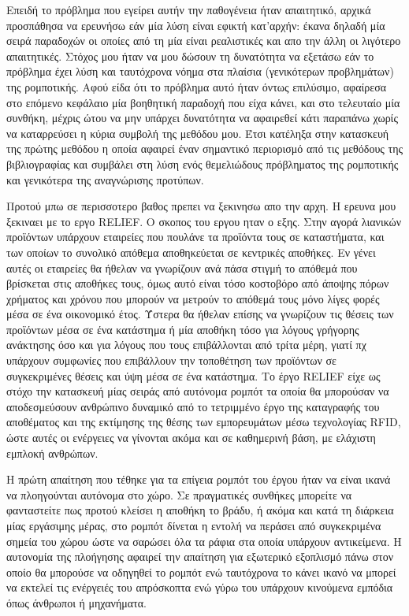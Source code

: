 \documentclass[a4paper,10pt]{article}
\begin{document}
Επειδή το πρόβλημα που εγείρει αυτήν την παθογένεια ήταν απαιτητικό, αρχικά
προσπάθησα να ερευνήσω εάν μία λύση είναι εφικτή κατ'αρχήν: έκανα δηλαδή μία
σειρά παραδοχών οι οποίες από τη μία είναι ρεαλιστικές και απο την άλλη οι
λιγότερο απαιτητικές. Στόχος μου ήταν να μου δώσουν τη δυνατότητα να εξετάσω
εάν το πρόβλημα έχει λύση και ταυτόχρονα νόημα στα πλαίσια (γενικότερων
προβλημάτων) της ρομποτικής. Αφού είδα ότι το πρόβλημα αυτό ήταν όντως
επιλύσιμο, αφαίρεσα στο επόμενο κεφάλαιο μία βοηθητική παραδοχή που είχα κάνει,
και στο τελευταίο μία συνθήκη, μέχρις ώτου να μην υπάρχει δυνατότητα να
αφαιρεθεί κάτι παραπάνω χωρίς να καταρρεύσει η κύρια συμβολή της μεθόδου μου.
Έτσι κατέληξα στην κατασκευή της πρώτης μεθόδου η οποία αφαιρεί έναν σημαντικό
περιορισμό από τις μεθόδους της βιβλιογραφίας και συμβάλει στη λύση ενός
θεμελιώδους πρόβληματος της ρομποτικής και γενικότερα της αναγνώρισης προτύπων.



Προτού μπω σε περισσοτερο βαθος πρεπει να ξεκινησω απο την αρχη. Η ερευνα μου
ξεκιναει με το εργο RELIEF. Ο σκοπος του εργου ηταν ο εξης. Στην αγορά λιανικών
προϊόντων υπάρχουν εταιρείες που πουλάνε τα προϊόντα τους σε καταστήματα, και
των οποίων το συνολικό απόθεμα αποθηκεύεται σε κεντρικές αποθήκες. Εν γένει
αυτές οι εταιρείες θα ήθελαν να γνωρίζουν ανά πάσα στιγμή το απόθεμά που
βρίσκεται στις αποθήκες τους, όμως αυτό είναι τόσο κοστοβόρο από άποψης πόρων
χρήματος και χρόνου που μπορούν να μετρούν το απόθεμά τους μόνο λίγες φορές
μέσα σε ένα οικονομικό έτος. Ύστερα θα ήθελαν επίσης να γνωρίζουν τις θέσεις
των προϊόντων μέσα σε ένα κατάστημα ή μία αποθήκη τόσο για λόγους γρήγορης
ανάκτησης όσο και για λόγους που τους επιβάλλονται από τρίτα μέρη, γιατί πχ
υπάρχουν συμφωνίες που επιβάλλουν την τοποθέτηση των προϊόντων σε συγκεκριμένες
θέσεις και ύψη μέσα σε ένα κατάστημα. Το έργο RELIEF είχε ως στόχο την
κατασκευή μίας σειράς από αυτόνομα ρομπότ τα οποία θα μπορούσαν να
αποδεσμεύσουν ανθρώπινο δυναμικό από το τετριμμένο έργο της καταγραφής του
αποθέματος και της εκτίμησης της θέσης των εμπορευμάτων μέσω τεχνολογίας RFID,
ώστε αυτές οι ενέργειες να γίνονται ακόμα και σε καθημερινή βάση, με ελάχιστη
εμπλοκή ανθρώπων.

Η πρώτη απαίτηση που τέθηκε για τα επίγεια ρομπότ του έργου ήταν να είναι ικανά
να πλοηγούνται αυτόνομα στο χώρο. Σε πραγματικές συνθήκες μπορείτε να
φανταστείτε πως προτού κλείσει η αποθήκη το βράδυ, ή ακόμα και κατά τη διάρκεια
μίας εργάσιμης μέρας, στο ρομπότ δίνεται η εντολή να περάσει από συγκεκριμένα
σημεία του χώρου ώστε να σαρώσει όλα τα ράφια στα οποία υπάρχουν αντικείμενα.
Η αυτονομία της πλοήγησης αφαιρεί την απαίτηση για εξωτερικό εξοπλισμό πάνω
στον οποίο θα μπορούσε να οδηγηθεί το ρομπότ ενώ ταυτόχρονα το κάνει ικανό να
μπορεί να εκτελεί τις ενέργειές του απρόσκοπτα ενώ γύρω του υπάρχουν κινούμενα
εμπόδια όπως άνθρωποι ή μηχανήματα.
\end{document}
